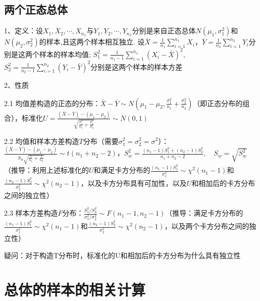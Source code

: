 \subsection{两个正态总体}

1、定义：设$X_{1}, X_{2}, \cdots, X_{n_{1}}$与$Y_{1}, Y_{2}, \cdots,Y_{n_{2}}$分别是来自正态总体$N\left(\mu_{1}, \sigma_{1}^{2}\right)$和$N\left(\mu_{2}, \sigma_{2}^{2}\right)$的样本,且这两个样本相互独立. 设$\bar{X}=\frac{1}{n_{1}} \sum_{i=1}^{n_{1}} X_{i}$，$\bar{Y}=\frac{1}{n_{2}} \sum_{i=1}^{n_{2}} Y_{i}$分别是这两个样本的样本均值; $S_{1}^{2}=\frac{1}{n_{1}-1} \sum_{i=1}^{n_{1}}\left(X_{i}-\bar{X}\right)^{2}$, $S_{2}^{2}=\frac{1}{n_{2}-1} \sum_{i=1}^{n_{2}}\left(Y_{i}-\bar{Y}\right)^{2}$分别是这两个样本的样本方差

2、性质

2.1 均值差构造的正态的分布：$\bar{X}-\bar{Y} \sim N\left(\mu_{1}-\mu_{2}, \frac{\sigma_{1}^{2}}{n_{1}}+\frac{\sigma_{2}^{2}}{n_{2}}\right)$（即正态分布的组合），标准化$ U=\frac{(\bar{X}-\bar{Y})-\left(\mu_{1}-\mu_{2}\right)}{\sqrt{\frac{\sigma_{1}^{2}}{n_{1}}+\frac{\sigma_{2}^{2}}{n_{2}}}} \sim N(0,1)$

2.2 均值和样本方差构造$T$分布（需要$\sigma_{1}^{2}=\sigma_{2}^{2}=\sigma^{2}$）：$\frac{(\bar{X}-\bar{Y})-\left(\mu_{1}-\mu_{2}\right)}{S_{w} \sqrt{\frac{1}{n_{1}}+\frac{1}{n_{2}}}} \sim t\left(n_{1}+n_{2}-2\right)$，$S_{w}^{2}=\frac{\left(n_{1}-1\right) S_{1}^{2}+\left(n_{2}-1\right) S_{2}^{2}}{n_{1}+n_{2}-2}, \quad S_{w}=\sqrt{S_{w}^{2}}$（推导：利用上述标准化的$U$和满足卡方分布的$\frac{(n_1-1) S_1^{2}}{\sigma_1^{2}} \sim \chi^{2}(n_1-1)$和$\frac{(n_2-1) S_2^{2}}{\sigma_2^{2}} \sim \chi^{2}(n_2-1)$，以及卡方分布具有可加性，以及$U$和相加后的卡方分布之间的独立性）

2.3 样本方差构造$F$分布：$\frac{S_{1}^{2} / S_{2}^{2}}{\sigma_{1}^{2} / \sigma_{2}^{2}} \sim F\left(n_{1}-1, n_{2}-1\right)$（推导：满足卡方分布的$\frac{(n_1-1) S_1^{2}}{\sigma_1^{2}} \sim \chi^{2}(n_1-1)$和$\frac{(n_2-1) S_2^{2}}{\sigma_2^{2}} \sim \chi^{2}(n_2-1)$，以及两个卡方分布之间的独立性）

疑问：对于构造T分布时，标准化的U和相加后的卡方分布为什么具有独立性

\section{总体的样本的相关计算}



